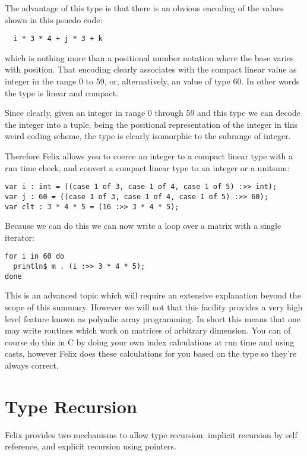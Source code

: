 \documentclass[oneside]{book}
\begin{document}
The advantage of this type is that there is an obvious
encoding of the values shown in this psuedo code:

\begin{verbatim}
  i * 3 * 4 + j * 3 + k
\end{verbatim}

which is nothing more than a positional number notation where the
base varies with position. That encoding clearly associates
with the compact linear value as integer in the range 0 to 59,
or, alternatively, an value of type 60. In other words the type
is linear and compact.

Since clearly, given an integer in range 0 through 59 and this type
we can decode the integer into a tuple, being the positional representation
of the integer in this weird coding scheme, the type is clearly
isomorphic to the subrange of integer.

Therefore Felix allows you to coerce an integer to a compact linear
type with a run time check, and convert a compact linear type
to an integer or a unitsum:

\begin{verbatim}
var i : int = ((case 1 of 3, case 1 of 4, case 1 of 5) :>> int);
var j : 60 = ((case 1 of 3, case 1 of 4, case 1 of 5) :>> 60);
var clt : 3 * 4 * 5 = (16 :>> 3 * 4 * 5);
\end{verbatim}

Because we can do this we can now write a loop over a matrix
with a single iterator:

\begin{verbatim}
for i in 60 do
  println$ m . (i :>> 3 * 4 * 5);
done
\end{verbatim}

This is an advanced topic which will require an extensive explanation
beyond the scope of this summary. However we will not that this
facility provides a very high level feature known as polyadic array
programming. In short this means that one may write routines which
work on matrices of arbitrary dimension. You can of course do this
in C by doing your own index calculations at run time and using
casts, however Felix does these calculations for you based on the
type so they're always correct.

\chapter{Type Recursion}
Felix provides two mechanisms to allow type recursion:
implicit recursion by self reference, and explicit recursion
using pointers.
\end{document}
